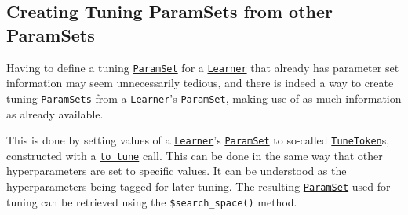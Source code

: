 \documentclass[
]{scrbook}
\newenvironment{Shaded}{\begin{snugshade}}{\end{snugshade}}
\newcommand{\AttributeTok}[1]{\textcolor[rgb]{0.77,0.63,0.00}{#1}}
\newcommand{\CommentTok}[1]{\textcolor[rgb]{0.56,0.35,0.01}{\textit{#1}}}
\newcommand{\DecValTok}[1]{\textcolor[rgb]{0.00,0.00,0.81}{#1}}
\newcommand{\FunctionTok}[1]{\textcolor[rgb]{0.00,0.00,0.00}{#1}}
\newcommand{\NormalTok}[1]{#1}
\newcommand{\OtherTok}[1]{\textcolor[rgb]{0.56,0.35,0.01}{#1}}
\newcommand{\SpecialCharTok}[1]{\textcolor[rgb]{0.00,0.00,0.00}{#1}}
\newcommand{\StringTok}[1]{\textcolor[rgb]{0.31,0.60,0.02}{#1}}
\renewenvironment{Shaded} {\begin{snugshade}\small} {\end{snugshade}}
\begin{document}
\hypertarget{creating-tuning-paramsets-from-other-paramsets}{%
\subsection{Creating Tuning ParamSets from other ParamSets}\label{creating-tuning-paramsets-from-other-paramsets}}

Having to define a tuning \href{https://paradox.mlr-org.com/reference/ParamSet.html}{\texttt{ParamSet}} for a \href{https://mlr3.mlr-org.com/reference/Learner.html}{\texttt{Learner}} that already has parameter set information may seem unnecessarily tedious, and there is indeed a way to create tuning \href{https://paradox.mlr-org.com/reference/ParamSet.html}{\texttt{ParamSets}} from a \href{https://mlr3.mlr-org.com/reference/Learner.html}{\texttt{Learner}}'s \href{https://paradox.mlr-org.com/reference/ParamSet.html}{\texttt{ParamSet}}, making use of as much information as already available.

This is done by setting values of a \href{https://mlr3.mlr-org.com/reference/Learner.html}{\texttt{Learner}}'s \href{https://paradox.mlr-org.com/reference/ParamSet.html}{\texttt{ParamSet}} to so-called \href{https://paradox.mlr-org.com/reference/to_tune.html}{\texttt{TuneToken}}s, constructed with a \href{https://paradox.mlr-org.com/reference/to_tune.html}{\texttt{to\_tune}} call.
This can be done in the same way that other hyperparameters are set to specific values.
It can be understood as the hyperparameters being tagged for later tuning.
The resulting \href{https://paradox.mlr-org.com/reference/ParamSet.html}{\texttt{ParamSet}} used for tuning can be retrieved using the \texttt{\$search\_space()} method.

\begin{Shaded}
\end{Shaded}
\end{document}
